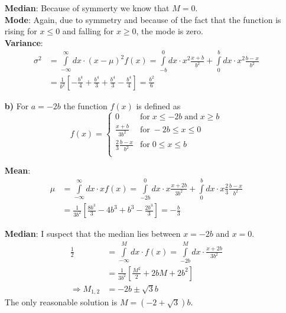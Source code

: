 \documentclass[10pt]{article}
\newenvironment{myfont}{\fontfamily{put}\selectfont}{\par}
\begin{document}
\begin{myfont}
\begin{itemize}
  \noindent \textbf{Median}: Because of symmerty we know that $M = 0$. \\

  \noindent \textbf{Mode}: Again, due to symmetry and because of the fact that the function is rising for $x \leq 0$ and falling for $x \geq 0$, the mode is zero. \\

  \noindent \textbf{Variance}:
  \begin{align*}
  \sigma^{2} & = \int\limits_{-\infty}^{\infty}dx \cdot (x - \mu)^{2}f(x) = \int\limits_{-b}^{0}dx \cdot x^{2}\frac{x+b}{b^{2}} + \int\limits_{0}^{b}dx \cdot x^{2}\frac{b-x}{b^{2}} \\
             & = \frac{1}{b^{2}}\left[-\frac{b^{4}}{4} + \frac{b^{4}}{3} + \frac{b^{4}}{3} - \frac{b^{4}}{4}\right] = \frac{b^{2}}{6}
  \end{align*}

  \item[\textbf{b)}] For $a = -2b$ the function $f(x)$ is defined as
  $$
  f(x) = 
  \begin{cases}
  0                            & \textrm{for}\; x \leq -2b \; \textrm{and}\; x \geq b \\
  \frac{x+b}{3b^{2}}           & \textrm{for}\; -2b \leq x \leq 0 \\
  \frac{2}{3}\frac{b-x}{b^{2}} & \textrm{for}\; 0 \leq x \leq b \\
  \end{cases}
  $$

  \noindent \textbf{Mean}:
  \begin{align*}
  \mu & = \int\limits_{-\infty}^{\infty}dx \cdot xf(x) = \int\limits_{-2b}^{0}dx \cdot x\frac{x+2b}{3b^{2}} + \int\limits_{0}^{b}dx \cdot x\frac{2}{3}\frac{b-x}{b^{2}} \\
      & = \frac{1}{3b^{2}}\left[\frac{8b^{3}}{3} - 4b^{3} + b^{3} - \frac{2b^{3}}{3}\right] = -\frac{b}{3}
  \end{align*}


  \noindent \textbf{Median}: I suspect that the median lies between $x = -2b$ and $x = 0$.
  \begin{align*}
  \frac{1}{2}         & = \int\limits_{-\infty}^{M}dx \cdot f(x) = \int\limits_{-2b}^{M}dx \cdot \frac{x+2b}{3b^{2}} \\
                      & = \frac{1}{3b^{2}} \left[\frac{M^{2}}{2} + 2bM + 2b^{2}\right] \\
  \Rightarrow M_{1,2} & = -2b \pm \sqrt{3}b
  \end{align*}
  \noindent The only reasonable solution is $M = (-2 + \sqrt{3})b$.


\end{itemize}
\end{myfont}
\end{document}
